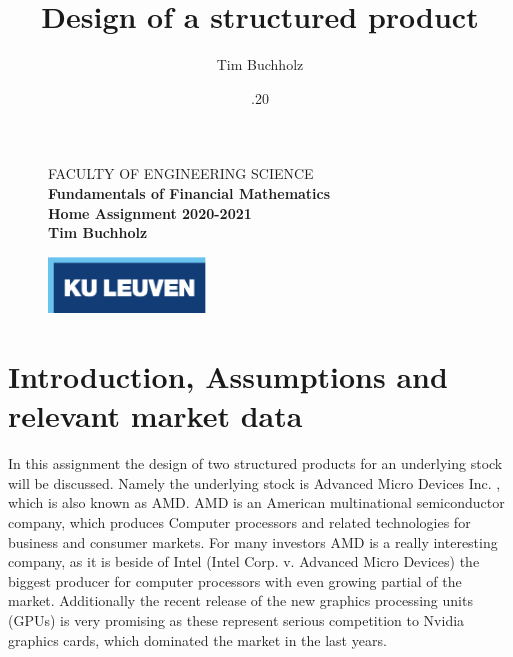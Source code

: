 \documentclass[11pt,oneside,a4paper]{article}
\title{\vspace*{40.0mm}
	\bf\sf Design of a structured product
	\vspace*{20.0mm} \\
	\vspace*{40.0mm}
}
\author{\sf Tim Buchholz}
\date{\sf 20.11.20}
\makeatletter
\def\cleardoublepage{\clearpage\if@twoside \ifodd\c@page\else%
	\hbox{}%
	\thispagestyle{empty}%
	\clearpage%
	\if@twocolumn\hbox{}\clearpage\fi\fi\fi}
\makeatother
\begin{document}
	
	\begin{figure}
		\parbox[t]{125mm}{
			\vspace*{6mm}
			\scriptsize\sf           FACULTY OF ENGINEERING SCIENCE\\
			\scriptsize\sf\bfseries  Fundamentals of Financial Mathematics \\
			\scriptsize\sf           Home Assignment 2020-2021 \\
			\scriptsize\sf           Tim Buchholz}
		\parbox[t]{40mm}{
			\begin{flushright}
				\includegraphics[height=15mm]{logo-eps-converted-to.pdf}
		\end{flushright}}
	\end{figure}
	
	\maketitle
	\thispagestyle{empty}
	\raggedbottom
	
	\cleardoublepage
	\setcounter{tocdepth}{2}
	
	\tableofcontents
	
	\cleardoublepage
	
	\section{Introduction, Assumptions and relevant market data}
	In this assignment the design of two structured products for an underlying stock will be discussed. Namely the underlying stock is Advanced Micro Devices Inc. , which is also known as AMD. AMD is an American multinational semiconductor company, which produces Computer processors and related technologies for business and consumer markets. 
	For many investors AMD is a really interesting company, as it is beside of Intel (Intel Corp. v. Advanced Micro Devices) the biggest producer for computer processors with even growing partial of the market. 
	Additionally the recent release of the new graphics processing units (GPUs) is very promising as these represent serious competition to Nvidia graphics cards, which dominated the market in the last years.
	
\end{document}
